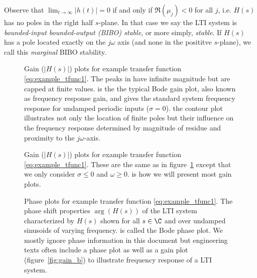 Observe that $\lim_{t\rightarrow \infty}|h(t)|=0$  if and only if $\Re{(\mu_j)} <0$ for all $j$, i.e. $H(s)$ has no poles in the right half $s$-plane.  In that case we say the LTI system is  \emph{bounded-input bounded-output (BIBO) stable}, or more simply, \emph{stable}.   If $H(s)$ has a pole located exactly on the $j\omega$ axis (and none in the posititve $s$-plane), we call this \emph{marginal}  BIBO stability.


\begin{figure}[ht]
\centering
{}

\hfill
{} 
\caption{Gain ($|H(s)|$) plots for example transfer function \eqref{eq:example_tfunc1}.  The peaks in  have infinite magnitude but are capped at finite values.    is the the typical Bode gain plot, also known as frequency response gain, and gives the  standard  system frequency response for undamped periodic inputs ($\sigma=0$).  the contour plot    illustrates not only the location of finite poles but their influence on the frequency response  determined by magnitude of residue and proximity to the $j \omega$-axis.}        
\label{fig:gain_plots}
\end{figure}

\begin{figure}[ht]
\centering
{}

\caption{Gain ($|H(s)|$) plots for example transfer function \eqref{eq:example_tfunc1}. These are the same as in figure~\ref{fig:gain_plots} except that we only consider $\sigma \leq 0$ and $\omega\geq0$.
 is how we will present most gain plots.}
\label{fig:gain_plots_cropped}
\end{figure}


\begin{figure}[ht]
\centering
{}\hfill
{}
\caption{Phase plots for example transfer function \eqref{eq:example_tfunc1}.  The phase shift properties $\arg(H(s))$ of the LTI system characterized by $H(s)$ shown for  all $s\in\C$ and   over undamped sinusoids of varying frequency.    is called the Bode phase plot.  We mostly ignore phase information in this document but engineering texts often include a phase plot as well as a gain plot (figure~\ref{fig:gain_b}) to illustrate frequency response of a LTI system. } 
\label{fig:phase_plots}
\end{figure}

